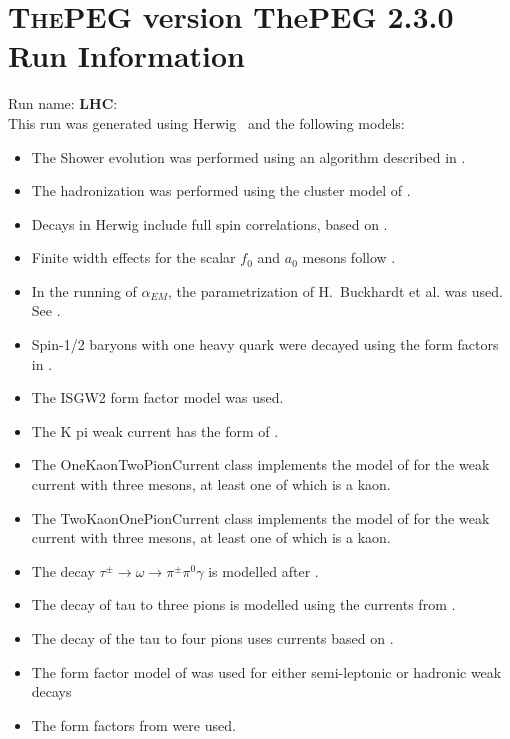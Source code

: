 \documentclass{article}
\begin{document}
\appendix
\section[xxx]{\textsc{ThePEG} version ThePEG 2.3.0 \cite{ThePEG} Run Information}
Run name: \textbf{LHC}:\\
This run was generated using Herwig~\cite{Bahr:2008pv} and the following models:
\begin{itemize}
\item The Shower evolution was performed using an algorithm described in \cite{Bahr:2008pv,Marchesini:1983bm,Marchesini:1987cf,Gieseke:2003rz,Masouminia:2021kne}.
\item The hadronization was performed using the cluster model of \cite{Webber:1983if}.
\item Decays in Herwig include full spin correlations, based on \cite{Richardson:2001df}.
\item Finite width effects for the scalar $f_0$ and $a_0$ mesons follow \cite{Flatte:1976xu}.
\item In the running of $\alpha_{EM}$, the parametrization of H.~Buckhardt et al. was used. See \cite{KLEISSCERN9808v3pp129}.
\item Spin-1/2 baryons with one heavy quark were decayed using the form factors in \cite{Singleton:1990ye}.
\item The ISGW2 form factor model \cite{Scora:1995ty} was used.
\item The K pi weak current has the form of \cite{Finkemeier:1996dh}.
\item The OneKaonTwoPionCurrent class implements the model of \cite{Finkemeier:1995sr} for the weak current with three mesons, at least one of which is a kaon.
\item The TwoKaonOnePionCurrent class implements the model of \cite{Finkemeier:1995sr} for the weak current with three mesons, at least one of which is a kaon.
\item The decay $\tau^\pm \to \omega \to \pi^\pm \pi^0 \gamma$ is modelled after \cite{Jadach:1993hs}.
\item The decay of tau to three pions is modelled using the currents from \cite{Asner:1999kj}.
\item The decay of the tau to four pions uses currents based on \cite{Bondar:2002mw}.
\item The form factor model of \cite{Bauer:1986bm,Wirbel:1985ji} was used for either semi-leptonic or hadronic weak decays
\item The form factors from \cite{Ivanov:1996fj} were used.

\end{itemize}
\end{document}
